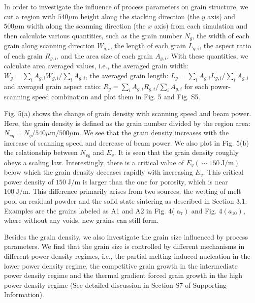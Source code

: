 \documentclass[10pt]{article}
\begin{document}
In order to investigate the influence of process parameters on grain structure, we cut a region with $540 \mu \mathrm{m}$ height along the stacking direction (the $y$ axis) and $500 \mu \mathrm{m}$ width along the scanning direction (the $x$ axis) from each simulation and then calculate various quantities, such as the grain number $N_{g}$, the width of each grain along scanning direction $W_{g, i}$, the length of each grain $L_{g, i}$, the aspect ratio of each grain $R_{g, i}$, and the area size of each grain $A_{g, i}$. With these quantities, we calculate area averaged values, i.e., the averaged grain width: $W_{g}=\sum_{i} A_{g, i} W_{g, i} / \sum_{i} A_{g, i}$, the averaged grain length: $L_{g}=\sum_{i} A_{g, i} L_{g, i} / \sum_{i} A_{g, i}$ and averaged grain aspect ratio: $R_{g}=\sum_{i} A_{g, i} R_{g, i} / \sum_{i} A_{g, i}$ for each power-scanning speed combination and plot them in Fig. 5 and Fig. S5.

Fig. 5(a) shows the change of grain density with scanning speed and beam power. Here, the grain density is defined as the grain number divided by the region area: $N_{v g}=N_{g} / 540 \mu \mathrm{m} / 500 \mu \mathrm{m}$. We see that the grain density increases with the increase of scanning speed and decrease of beam power. We also plot in Fig. 5(b) the relationship between $N_{v g}$ and $E_{v}$. It is seen that the grain density roughly obeys a scaling law. Interestingly, there is a critical value of $E_{v}(\sim 150 \mathrm{~J} / \mathrm{m})$ below which the grain density deceases rapidly with increasing $E_{v}$. This critical power density of $150 \mathrm{~J} / \mathrm{m}$ is larger than the one for porosity, which is near $100 \mathrm{~J} / \mathrm{m}$. This difference primarily arises from two sources: the wetting of melt pool on residual powder and the solid state sintering as described in Section 3.1. Examples are the grains labeled as A1 and A2 in Fig. 4( $\left.\mathrm{a}_{7}\right)$ and Fig. $4\left(a_{10}\right)$, where without any voids, new grains can still form.

Besides the grain density, we also investigate the grain size influenced by process parameters. We find that the grain size is controlled by different mechanisms in different power density regimes, i.e., the partial melting induced nucleation in the lower power density regime, the competitive grain growth in the intermediate power density regime and the thermal gradient forced grain growth in the high power density regime (See detailed discussion in Section S7 of Supporting Information).
\end{document}
